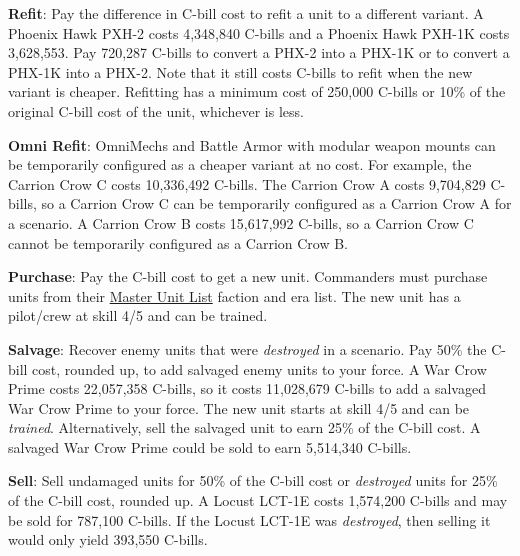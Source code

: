 \begin{description}
\item {\bfseries Refit}: Pay the difference in C-bill cost to refit a unit to a different variant.
A Phoenix Hawk PXH-2 costs 4,348,840 C-bills and a Phoenix Hawk PXH-1K costs 3,628,553.
Pay 720,287 C-bills to convert a PHX-2 into a PHX-1K or to convert a PHX-1K into a PHX-2.
Note that it still costs C-bills to refit when the new variant is cheaper.
Refitting has a minimum cost of 250,000 C-bills or 10\% of the original C-bill cost of the unit, whichever is less.

\item {\bfseries Omni Refit}: OmniMechs and Battle Armor with modular weapon mounts can be temporarily configured as a cheaper variant at no cost.
For example, the Carrion Crow C costs 10,336,492 C-bills.
The Carrion Crow A costs 9,704,829 C-bills, so a Carrion Crow C can be temporarily configured as a Carrion Crow A for a scenario.
A Carrion Crow B costs 15,617,992 C-bills, so a Carrion Crow C cannot be temporarily configured as a Carrion Crow B.

\item {\bfseries Purchase}: Pay the C-bill cost to get a new unit.
Commanders must purchase units from their \href{http://www.masterunitlist.info}{Master Unit List} faction and era list.
The new unit has a pilot/crew at skill 4/5 and can be trained.

\item {\bfseries Salvage}: Recover enemy units that were \emph{destroyed} in a scenario.
Pay 50\% the C-bill cost, rounded up, to add salvaged enemy units to your force.
A War Crow Prime costs 22,057,358 C-bills, so it costs 11,028,679 C-bills to add a salvaged War Crow Prime to your force.
The new unit starts at skill 4/5 and can be \emph{trained}.
Alternatively, sell the salvaged unit to earn 25\% of the C-bill cost.
A salvaged War Crow Prime could be sold to earn 5,514,340 C-bills.

\item {\bfseries Sell}: Sell undamaged units for 50\% of the C-bill cost or \emph{destroyed} units for 25\% of the C-bill cost, rounded up.
A Locust LCT-1E costs 1,574,200 C-bills and may be sold for 787,100 C-bills.
If the Locust LCT-1E was \emph{destroyed}, then selling it would only yield 393,550 C-bills.

\end{description}
